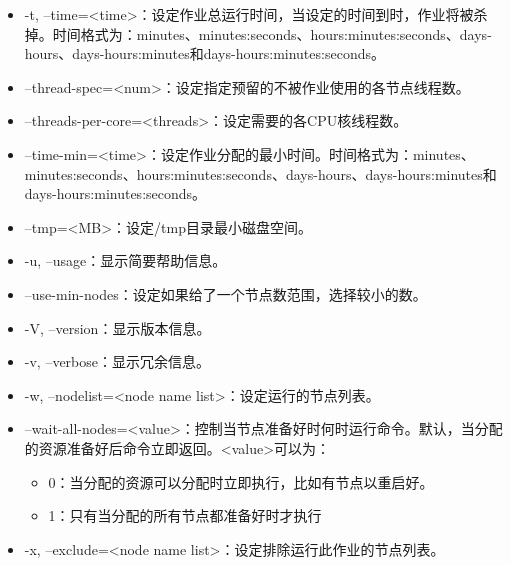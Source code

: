 \begin{itemize}
%
    \item -t, --time=<time>：设定作业总运行时间，当设定的时间到时，作业将被杀掉。时间格式为：minutes、minutes:seconds、hours:minutes:seconds、days-hours、days-hours:minutes和days-hours:minutes:seconds。
	\item --thread-spec=<num>：设定指定预留的不被作业使用的各节点线程数。
	\item --threads-per-core=<threads>：设定需要的各CPU核线程数。
	\item --time-min=<time>：设定作业分配的最小时间。时间格式为：minutes、minutes:seconds、hours:minutes:seconds、days-hours、days-hours:minutes和
days-hours:minutes:seconds。
	\item --tmp=<MB>：设定/tmp目录最小磁盘空间。
	\item -u, --usage：显示简要帮助信息。
	\item --use-min-nodes：设定如果给了一个节点数范围，选择较小的数。
	\item -V, --version：显示版本信息。
	\item -v, --verbose：显示冗余信息。
	\item -w, --nodelist=<node name list>：设定运行的节点列表。
	\item --wait-all-nodes=<value>：控制当节点准备好时何时运行命令。默认，当分配的资源准备好后命令立即返回。<value>可以为：
\begin{itemize}
	\item 0：当分配的资源可以分配时立即执行，比如有节点以重启好。
    \item 1：只有当分配的所有节点都准备好时才执行
\end{itemize}


    \item -x, --exclude=<node name list>：设定排除运行此作业的节点列表。
\end{itemize}

